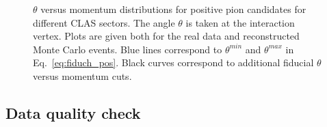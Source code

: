 \begin{figure}[htp]
\begin{center}
\caption{\small $\theta$ versus momentum distributions for positive pion candidates for different CLAS sectors. The angle $\theta$ is taken at the interaction vertex. Plots are given both for the real data and reconstructed Monte Carlo events. Blue lines correspond to $\theta^{min}$ and $\theta^{max}$ in Eq.~\eqref{eq:fiduch_pos}. Black curves correspond to additional fiducial $\theta$ versus momentum cuts. \label{fig:th_vs_p_pip}}
\end{center}
\end{figure}

\clearpage

\subsection{Data quality check}
\label{Sect:qcheck}
\afterpage{\clearpage}

